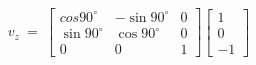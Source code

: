 \documentclass[preview]{standalone}
\begin{document}
\begin{align*}
v_z\ =\ \begin{bmatrix}
                        cos90^\circ & -\sin90^\circ & 0\\
                        \sin90^\circ & \cos90^\circ & 0 \\
                        0 & 0 & 1
                        \end{bmatrix}\begin{bmatrix}
                        1\\
                        0\\
                        -1
                        \end{bmatrix}\\
\end{align*}
\end{document}
